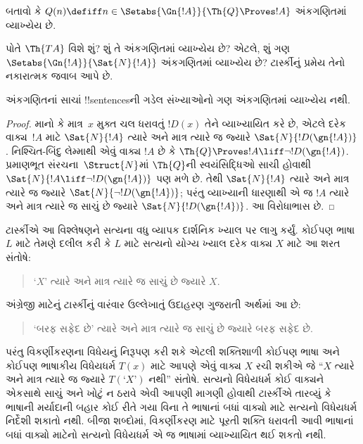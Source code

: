 \documentclass[../../../include/open-logic-section]{subfiles}
\begin{document}
\begin{prob}
બતાવો કે $Q(n) \defiff n \in \Setabs{\Gn{!A}}{\Th{Q} \Proves !A}$ અંકગણિતમાં વ્યાખ્યેય છે.
\end{prob}

પોતે $\Th{TA}$ વિશે શું? શું તે અંકગણિતમાં વ્યાખ્યેય છે? એટલે, શું ગણ $\Setabs{\Gn{!A}}{\Sat{N}{!A}}$ અંકગણિતમાં વ્યાખ્યેય છે? ટાર્સ્કીનું પ્રમેય તેનો નકારાત્મક જવાબ આપે છે.

\begin{thm}
અંકગણિતનાં સાચાં !!{sentence}sની ગડેલ સંખ્યાઓનો ગણ અંકગણિતમાં વ્યાખ્યેય નથી.
\end{thm}

\begin{proof}
માનો કે માત્ર~$x$ મુક્ત ચલ ધરાવતું $!D(x)$ તેને વ્યાખ્યાયિત કરે છે, એટલે દરેક વાક્ય~$!A$ માટે $\Sat{N}{!A}$ ત્યારે અને માત્ર ત્યારે જ જ્યારે $\Sat{N}{!D(\gn{!A})}$. નિશ્ચિત-બિંદુ લેમ્માથી એવું વાક્ય $!A$ છે કે $\Th{Q} \Proves !A \liff \lnot !D(\gn{!A})$. પ્રમાણભૂત સંરચના~$\Struct{N}$માં $\Th{Q}$ની સ્વયંસિદ્ધિઓ સાચી હોવાથી $\Sat{N}{!A \liff \lnot !D(\gn{!A})}$ પણ મળે છે. તેથી $\Sat{N}{!A}$ ત્યારે અને માત્ર ત્યારે જ જ્યારે $\Sat{N}{\lnot !D(\gn{!A})}$; પરંતુ વ્યાખ્યાની ધારણાથી એ જ $!A$ ત્યારે અને માત્ર ત્યારે જ સાચું છે જ્યારે $\Sat{N}{!D(\gn{!A})}$. આ વિરોધાભાસ છે.
\end{proof}

ટાર્સ્કીએ આ વિશ્લેષણને સત્યના વધુ વ્યાપક દાર્શનિક ખ્યાલ પર લાગુ કર્યું. કોઈપણ ભાષા $L$ માટે તેમણે દલીલ કરી કે $L$ માટે સત્યનો યોગ્ય ખ્યાલ દરેક વાક્ય $X$ માટે આ શરત સંતોષે:
\begin{quote}
`$X$' ત્યારે અને માત્ર ત્યારે જ સાચું છે જ્યારે $X$.
\end{quote}
અંગ્રેજી માટેનું ટાર્સ્કીનું વારંવાર ઉલ્લેખાતું ઉદાહરણ ગુજરાતી અર્થમાં આ છે:
\begin{quote}
`બરફ સફેદ છે' ત્યારે અને માત્ર ત્યારે જ સાચું છે જ્યારે બરફ સફેદ છે.
\end{quote}
પરંતુ વિકર્ણીકરણના વિધેયનું નિરૂપણ કરી શકે એટલી શક્તિશાળી કોઈપણ ભાષા અને કોઈપણ ભાષાકીય વિધેયધર્મ $T(x)$ માટે આપણે એવું વાક્ય $X$ રચી શકીએ જે ``$X$ ત્યારે અને માત્ર ત્યારે જ જ્યારે $T(\text{`$X$'})$ નથી'' સંતોષે. સત્યનો વિધેયધર્મ કોઈ વાક્યને એકસાથે સાચું અને ખોટું ન ઠરાવે એવી આપણી માગણી હોવાથી ટાર્સ્કીએ તારવ્યું કે ભાષાની મર્યાદાની બહાર કોઈ રીતે ગયા વિના તે ભાષાનાં બધાં વાક્યો માટે સત્યનો વિધેયધર્મ નિર્દેશી શકાતો નથી. બીજા શબ્દોમાં, વિકર્ણીકરણ માટે પૂરતી શક્તિ ધરાવતી આવી ભાષાનાં બધાં વાક્યો માટેનો સત્યનો વિધેયધર્મ એ જ ભાષામાં વ્યાખ્યાયિત થઈ શકતો નથી.
\end{document}
